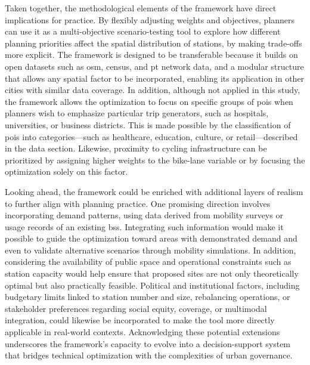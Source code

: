 Taken together, the methodological elements of the framework have direct implications for practice. By flexibly adjusting weights and objectives, planners can use it as a multi-objective scenario-testing tool to explore how different planning priorities affect the spatial distribution of stations, by making trade-offs more explicit. The framework is designed to be transferable because it builds on open datasets such as \ac{osm}, census, and \ac{pt} network data, and a modular structure that allows any spatial factor to be incorporated, enabling its application in other cities with similar data coverage. In addition, although not applied in this study, the framework allows the optimization to focus on specific groups of \acp{poi} when planners wish to emphasize particular trip generators, such as hospitals, universities, or business districts. This is made possible by the classification of \acp{poi} into categories—such as healthcare, education, culture, or retail—described in the data section. Likewise, proximity to cycling infrastructure can be prioritized by assigning higher weights to the bike-lane variable or by focusing the optimization solely on this factor.

Looking ahead, the framework could be enriched with additional layers of realism to further align with planning practice. One promising direction involves incorporating demand patterns, using data derived from mobility surveys or usage records of an existing \ac{bss}. Integrating such information would make it possible to guide the optimization toward areas with demonstrated demand and even to validate alternative scenarios through mobility simulations. In addition, considering the availability of public space and operational constraints such as station capacity would help ensure that proposed sites are not only theoretically optimal but also practically feasible. Political and institutional factors, including budgetary limits linked to station number and size, rebalancing operations, or stakeholder preferences regarding social equity, coverage, or multimodal integration, could likewise be incorporated to make the tool more directly applicable in real-world contexts. Acknowledging these potential extensions underscores the framework’s capacity to evolve into a decision-support system that bridges technical optimization with the complexities of urban governance.